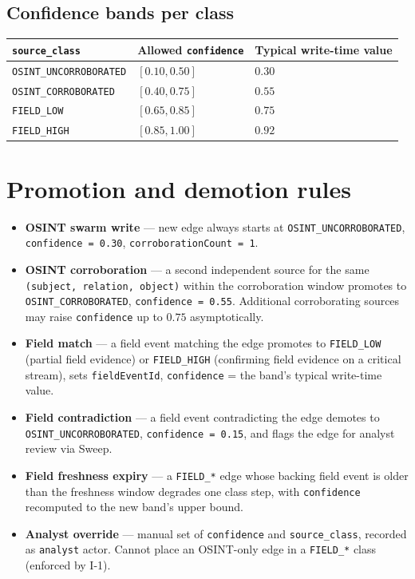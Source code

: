 \subsection{Confidence bands per class}
\begin{center}
\begin{tabular}{@{}lll@{}}
\toprule
\texttt{source\_class} & Allowed \texttt{confidence} & Typical write-time value \\
\midrule
\texttt{OSINT\_UNCORROBORATED} & $[0.10, 0.50]$ & $0.30$ \\
\texttt{OSINT\_CORROBORATED}   & $[0.40, 0.75]$ & $0.55$ \\
\texttt{FIELD\_LOW}            & $[0.65, 0.85]$ & $0.75$ \\
\texttt{FIELD\_HIGH}           & $[0.85, 1.00]$ & $0.92$ \\
\bottomrule
\end{tabular}
\end{center}

\section{Promotion and demotion rules}

\begin{itemize}[leftmargin=1.2em]
  \item \textbf{OSINT swarm write} --- new edge always starts at \texttt{OSINT\_UNCORROBORATED}, \texttt{confidence = 0.30}, \texttt{corroborationCount = 1}.
  \item \textbf{OSINT corroboration} --- a second independent source for the same \texttt{(subject, relation, object)} within the corroboration window promotes to \texttt{OSINT\_CORROBORATED}, \texttt{confidence = 0.55}. Additional corroborating sources may raise \texttt{confidence} up to $0.75$ asymptotically.
  \item \textbf{Field match} --- a field event matching the edge promotes to \texttt{FIELD\_LOW} (partial field evidence) or \texttt{FIELD\_HIGH} (confirming field evidence on a critical stream), sets \texttt{fieldEventId}, \texttt{confidence} = the band's typical write-time value.
  \item \textbf{Field contradiction} --- a field event contradicting the edge demotes to \texttt{OSINT\_UNCORROBORATED}, \texttt{confidence = 0.15}, and flags the edge for analyst review via Sweep.
  \item \textbf{Field freshness expiry} --- a \texttt{FIELD\_*} edge whose backing field event is older than the freshness window degrades one class step, with \texttt{confidence} recomputed to the new band's upper bound.
  \item \textbf{Analyst override} --- manual set of \texttt{confidence} and \texttt{source\_class}, recorded as \texttt{analyst} actor. Cannot place an OSINT-only edge in a \texttt{FIELD\_*} class (enforced by I-1).
\end{itemize}

